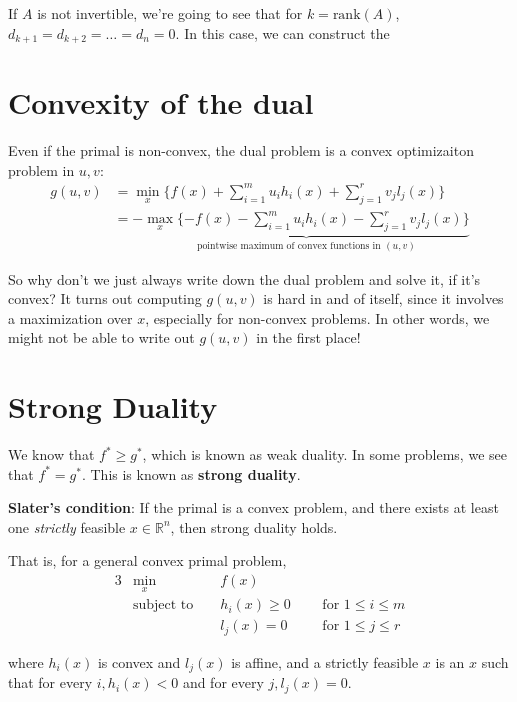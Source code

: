 \documentclass[11pt]{article}
\newcommand{\R}{\mathbb{R}}
\begin{document}
If $A$ is not invertible, we're going to see that for $k = \text{rank}(A)$,
$d_{k+1} = d_{k+2} = \dots = d_n = 0$. In this case, we can construct the

\section{Convexity of the dual}

Even if the primal is non-convex, the dual problem is a convex optimizaiton
problem in $u, v$:
\begin{align*}
g(u, v) &= \min_x \{f(x) + \sum_{i=1}^m u_i h_i(x) + \sum_{j=1}^r v_j l_j(x) \} \\
        &= - \underbrace{\max_x \{-f(x) - \sum_{i=1}^m u_i h_i(x) - \sum_{j=1}^r v_j l_j(x) \}}_{\text{pointwise maximum of convex functions in } (u, v)}
\end{align*}

So why don't we just always write down the dual problem and solve it, if it's
convex? It turns out computing $g(u, v)$ is hard in and of itself, since it
involves a maximization over $x$, especially for non-convex problems. In other
words, we might not be able to write out $g(u, v)$ in the first place!

\section{Strong Duality}
We know that $f^* \geq g^*$, which is known as weak duality. In some problems, we
see that $f^* = g^*$. This is known as \textbf{strong duality}.

\textbf{Slater's condition}: If the primal is a convex problem, and there exists
at least one \textit{strictly} feasible $x \in \R^n$, then strong duality holds.

That is, for a general convex primal problem,
\begin{alignat*}{3}
&\min_x &&f(x) \\
&\text{subject to } && h_i(x) \geq 0 ~~~&&\text{for } 1 \leq i \leq m \\
&&& l_j(x) = 0 ~~~&&\text{for } 1 \leq j \leq r
\end{alignat*}

where $h_i(x)$ is convex and $l_j(x)$ is affine, and a strictly feasible $x$ is
an $x$ such that for every $i, h_i(x) < 0$ and for every
$j, l_j(x) = 0$.
\end{document}
